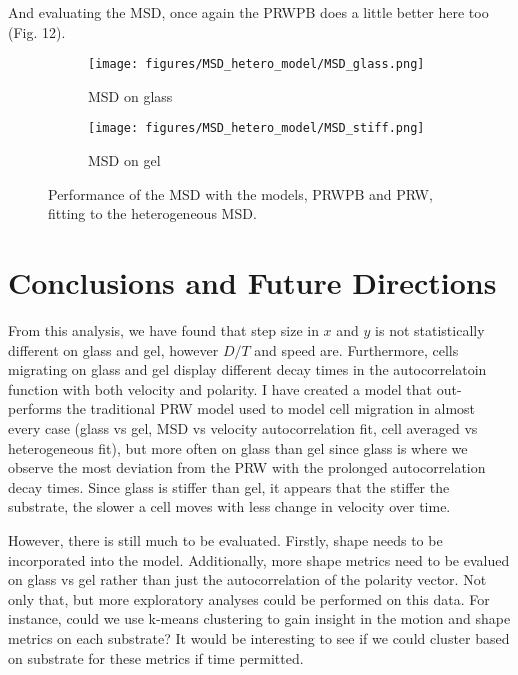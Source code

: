 \documentclass[12pt]{article}
\begin{document}
And evaluating the MSD, once again the PRWPB does a little better here too (Fig. 12).

\begin{figure}[h!]
  \centering
  \begin{subfigure}[b]{0.4\linewidth}
    \texttt{[image: figures/MSD\_hetero\_model/MSD\_glass.png]}
    \caption{MSD on glass}
  \end{subfigure}
  \begin{subfigure}[b]{0.4\linewidth}
    \texttt{[image: figures/MSD\_hetero\_model/MSD\_stiff.png]}
    \caption{MSD on gel}
  \end{subfigure}
  \caption{Performance of the MSD with the models, PRWPB and PRW, fitting to the heterogeneous MSD.}
\end{figure}

\section{Conclusions and Future Directions}

From this analysis, we have found that step size in $x$ and $y$ is not statistically different on glass and gel, however $D/T$ and speed are.
Furthermore, cells migrating on glass and gel display different decay times in the autocorrelatoin function with both velocity and polarity.
I have created a model that out-performs the traditional PRW model used to model cell migration in almost every case (glass vs gel, MSD vs velocity autocorrelation fit,
cell averaged vs heterogeneous fit), but more often on glass than gel since glass is where we observe the most deviation from the PRW with the prolonged autocorrelation decay times.
Since glass is stiffer than gel, it appears that the stiffer the substrate, the slower a cell moves with less change in velocity over time.

However, there is still much to be evaluated. Firstly, shape needs to be incorporated into the model. Additionally, more shape metrics need to be evalued on glass vs gel rather
than just the autocorrelation of the polarity vector. Not only that, but more exploratory analyses could be performed on this data. For instance, could we use k-means clustering
to gain insight in the motion and shape metrics on each substrate? It would be interesting to see if we could cluster based on substrate for these metrics if time permitted. 
\end{document}
